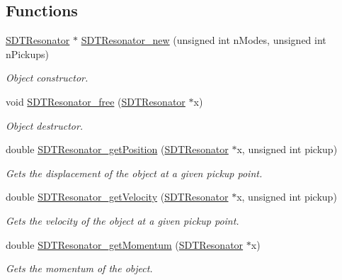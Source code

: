 \subsection*{Functions}
\begin{DoxyCompactItemize}
\item 
\hyperlink{group__resonators_ga07d183de45e9713277c8f62d93d9be9c}{S\+D\+T\+Resonator} $\ast$ \hyperlink{group__resonators_gafc2bc415946d68612d636498bb44b1fd}{S\+D\+T\+Resonator\+\_\+new} (unsigned int n\+Modes, unsigned int n\+Pickups)
\begin{DoxyCompactList}\small\item\em Object constructor. \end{DoxyCompactList}\item 
void \hyperlink{group__resonators_ga0b7fd515fd2eb17e061cbfcada75d397}{S\+D\+T\+Resonator\+\_\+free} (\hyperlink{group__resonators_ga07d183de45e9713277c8f62d93d9be9c}{S\+D\+T\+Resonator} $\ast$x)
\begin{DoxyCompactList}\small\item\em Object destructor. \end{DoxyCompactList}\item 
double \hyperlink{group__resonators_ga0663f869ee1b568cc2fe036d9bb792b8}{S\+D\+T\+Resonator\+\_\+get\+Position} (\hyperlink{group__resonators_ga07d183de45e9713277c8f62d93d9be9c}{S\+D\+T\+Resonator} $\ast$x, unsigned int pickup)
\begin{DoxyCompactList}\small\item\em Gets the displacement of the object at a given pickup point. \end{DoxyCompactList}\item 
double \hyperlink{group__resonators_ga110d43ebf6d69058d2532b1afa5b28f3}{S\+D\+T\+Resonator\+\_\+get\+Velocity} (\hyperlink{group__resonators_ga07d183de45e9713277c8f62d93d9be9c}{S\+D\+T\+Resonator} $\ast$x, unsigned int pickup)
\begin{DoxyCompactList}\small\item\em Gets the velocity of the object at a given pickup point. \end{DoxyCompactList}\item 
double \hyperlink{group__resonators_ga76167015f454008ea539678863ef4196}{S\+D\+T\+Resonator\+\_\+get\+Momentum} (\hyperlink{group__resonators_ga07d183de45e9713277c8f62d93d9be9c}{S\+D\+T\+Resonator} $\ast$x)
\begin{DoxyCompactList}\small\item\em Gets the momentum of the object. \end{DoxyCompactList}\item 

\end{DoxyCompactItemize}
